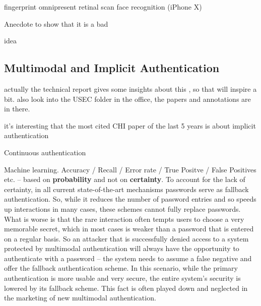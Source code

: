 	\cite{Jakobsson2014HowToWearYourPW,DeLuca2012TouchMeOnce,Peisert2013PriciplesAuthentication,Rybnicek2014RoadmapContinuousAuth}
	
	\cite{Chiasson2009InterferencesGraphical}
	
	\cite{Katsini2017StrategiesGraphicalPasswords}

	fingerprint omnipresent 
	retinal scan
	face recognition (iPhone X)
	
	
	Anecdote to show that it is a bad
	 
	 idea  
	
	\subsection{Multimodal and Implicit Authentication}
	
	actually the technical report gives some insights about this \cite{Stockinger2011ImplicitAuthentication}, so that will inspire a bit.
	also look into the USEC folder in the office, the papers and annotations are in there.
	
		it's interesting that the most cited CHI paper of the last 5 years is about implicit authentication \cite{DeLuca2012TouchMeOnce}
		
		\cite{Roalter2013SmartphoneProxy}
		
		Continuous authentication \cite{Peisert2013PriciplesAuthentication}
	
	Machine learning. Accuracy / Recall / Error rate / True Positve / False Positives etc. -- based on \textbf{probability} and not on \textbf{certainty}. To account for the lack of certainty, in all current state-of-the-art mechanisms passwords serve as fallback authentication. So, while it reduces the number of password entries and so speeds up interactions in many cases, these schemes cannot fully replace passwords. What is worse is that the rare interaction often tempts users to choose a very memorable secret, which in most cases is weaker than a password that is entered on a regular basis. So an attacker that is successfully denied access to a system protected by multimodal authentication will always have the opportunity to authenticate with a password -- the system needs to assume a false negative and offer the fallback authentication scheme. In this scenario, while the primary authentication is more usable and very secure, the entire system's security is lowered by its fallback scheme. This fact is often played down and neglected in the marketing of new multimodal authentication. 
	
